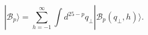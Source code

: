 \begin{equation}
  |\mathcal{B}_p \rangle = \sum_{h=-1}^{\infty} \int d^{25-p}q_{\bot} 
  |\mathcal{B}_p(q_{\bot},h)\rangle.
\end{equation}

